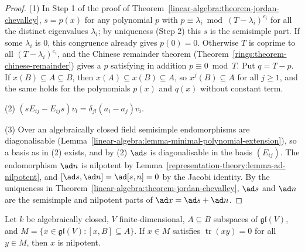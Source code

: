 \begin{proof}
(1) In Step 1 of the proof of Theorem~\ref{linear-algebra:theorem-jordan-chevalley}, $s = p(x)$ for any polynomial $p$ with $p \equiv \lambda_i \bmod (T - \lambda_i)^{e_i}$ for all
the distinct eigenvalues $\lambda_i$; by uniqueness (Step 2) this $s$ is the semisimple part. If some $\lambda_i$ is $0$, this congruence already gives $p(0) = 0$. Otherwise $T$ is
coprime to all $(T - \lambda_i)^{e_i}$, and the Chinese remainder theorem (Theorem~\ref{rings:theorem-chinese-remainder}) gives a $p$ satisfying in addition
$p \equiv 0 \bmod T$. Put $q = T - p$. If $x(B) \subseteq A \subseteq B$, then $x(A) \subseteq x(B) \subseteq A$, so $x^j(B) \subseteq A$ for all $j \geq 1$, and the same holds for
the polynomials $p(x)$ and $q(x)$ without constant term.

(2) $(sE_{ij} - E_{ij}s)v_l = \delta_{jl}(a_i - a_j)v_i$.

(3) Over an algebraically closed field semisimple endomorphisms are diagonalisable (Lemma~\ref{linear-algebra:lemma-minimal-polynomial-extension}), so a basis as in (2)
exists, and by (2) $\ad s$ is diagonalisable in the basis $(E_{ij})$. The endomorphism $\ad n$ is nilpotent by Lemma~\ref{representation-theory:lemma-ad-nilpotent}, and
$[\ad s, \ad n] = \ad[s, n] = 0$ by the Jacobi identity. By the uniqueness in Theorem~\ref{linear-algebra:theorem-jordan-chevalley}, $\ad s$ and $\ad n$ are the semisimple and
nilpotent parts of $\ad x = \ad s + \ad n$.
\end{proof}

\begin{lemma}\label{representation-theory:lemma-cartan-trace}
Let $k$ be algebraically closed, $V$ finite-dimensional, $A \subseteq B$ subspaces of $\mathfrak{gl}(V)$, and $M = \{x \in \mathfrak{gl}(V) : [x, B] \subseteq A\}$. If $x \in M$
satisfies $\operatorname{tr}(xy) = 0$ for all $y \in M$, then $x$ is nilpotent.
\end{lemma}

